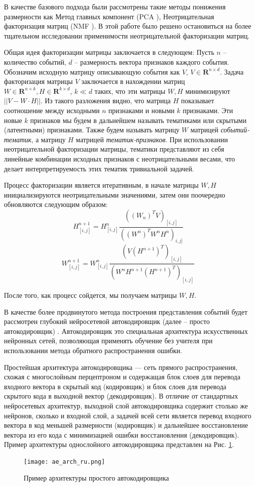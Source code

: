 В качестве базового подхода были рассмотрены такие методы понижения размерности как Метод главных компонент (PCA \cite{pca_orig}), Неотрицательная факторизация матриц (NMF \cite{nmf_orig}). В этой работе было решено остановиться на более тщательном исследовании применимости неотрицательной факторизации матриц. 

Общая идея факторизации матрицы заключается в следующем: 
Пусть $n$ -- количество событий, $d$ -- размерность вектора признаков каждого события. Обозначим исходную матрицу описывающую события как $V$, $V \in \mathbf{R}^{n \times d}$. Задача факторизация матрицы $V$ заключается в нахождении матриц $W \in \mathbf{R}^{n \times k}, H \in \mathbf{R}^{k \times d}$, $k \ll d$ таких, что эти матрицы $W, H$ минимизируют $||V - W \cdot H||$. Из такого разложения видно, что матрица $H$ показывает соотношение между исходными $n$ признаками и новыми $k$ признаками. Эти новые $k$ признаков мы будем в дальнейшем называть тематиками или скрытыми (латентными) признаками. Также будем называть матрицу $W$ матрицей \textit{событий-тематик}, а матрицу $H$ матрицей \textit{тематик-признаков}.
При использовании неотрицательной факторизации матрицы, тематики представляют из себя линейные комбинации исходных признаков с неотрицательными весами, что делает интерпретируемость этих тематик тривиальной задачей.

Процесс факторизации является итеративным, в начале матрицы $W, H$ инициализируются неотрицательными значениями, затем они поочередно обновляются следующим образом:
$$H^{n+1}_{[i,j]} = H^n_{[i,j]} \frac{((W_n)^TV)_{[i,j]}}{((W^n)^TW^nH^n)_{i,j]}}$$
$$W^{n+1}_{[i,j]} = W^n_{[i,j]} \frac{(V(H^{n+1})^T)_{[i,j]}}{(W^nH^{n+1}(H^{n+1})^T)_{[i,j]}}$$

После того, как процесс сойдется, мы получаем матрицы $W,H$.

В качестве более продвинутого метода построения представления событий будет рассмотрен глубокий нейросетевой автокодировщик (далее -- просто автокодировщик) \cite{ae_orig}. 
Автокодировщик это специальная архитектура искусственных нейронных сетей, позволяющая применять обучение без учителя при использовании метода обратного распространения ошибки.

Простейшая архитектура автокодировщика — сеть прямого распространения, схожая с многослойным перцептроном и содержащая блок слоев для перевода входного вектора в скрытый код (кодировщик) и блок слоев для перевода скрытого кода в выходной вектор (декодировщик). В отличие от стандартных нейросетевых архитектур, выходной слой автокодировщика содержит столько же нейронов, сколько и входной слой, а задачей всей сети является перевод входного вектора в код меньшей размерности (кодировщик) и дальнейшее восстановление вектора из его кода с минимизацией ошибки восстановления (декодировщик). Пример архитектуры однослойного автокодировщика представлен на Рис. \ref{fig:ae_arch}.
\begin{figure}
\centering
  \texttt{[image: ae\_arch\_ru.png]}
  \caption{Пример архитектуры простого автокодировщика}
  \label{fig:ae_arch}
\end{figure}


